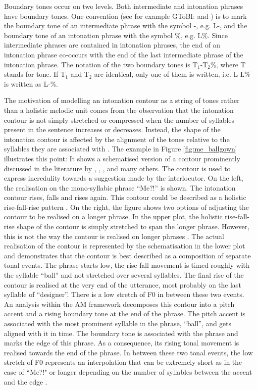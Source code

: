 Boundary tones occur on two levels. Both intermediate and intonation phrases have boundary tones. One convention (see for example GToBI: \citealp{GriceBaumann2002} and \citealp{GriceBaumannBenzmüller2005}) is to mark the boundary tone of an intermediate phrase with the symbol -, e.g. L-, and the boundary tone of an intonation phrase with the symbol \%, e.g. L\%. Since intermediate phrases are contained in intonation phrases, the end of an intonation phrase co-occurs with the end of the last intermediate phrase of the intonation phrase. The notation of the two boundary tones is T$_1$-T$_2$\%, where T stands for tone. If T$_1$ and T$_2$ are identical, only one of them is written, i.e. L-L\% is written as L-\%. 

The motivation of modelling an intonation contour as a string of tones rather than a holistic melodic unit comes from the observation that the intonation contour is not simply stretched or compressed when the number of syllables present in the sentence increases or decreases. Instead, the shape of the intonation contour is affected by the alignment of the tones relative to the syllables they are associated with \citep{Ladd2008, Arvaniti2011}. The example in Figure \ref{fig:me_ballgown} illustrates this point: It shows a schematised version of a contour prominently discussed in the literature by \citet{HirschbergWard1985}, \citet{HirschbergWard1992}, \citet{Arvaniti2011}, \citet{Ladd2008} and many others. The contour is used to express incredulity towards a suggestion made by the interlocutor. On the left, the realisation on the mono-syllabic phrase ``Me?!” is shown. The intonation contour rises, falls and rises again. This contour could be described as a holistic rise-fall-rise pattern \citep{Ladd2008}. On the right, the figure shows two options of adjusting the contour to be realised on a longer phrase. In the upper plot, the holistic rise-fall-rise shape of the contour is simply stretched to span the longer phrase. However, this is not the way the contour is realised on longer phrases \citep{Arvaniti2011}. The actual realisation of the contour is represented by the schematisation in the lower plot and demonstrates that the contour is best described as a composition of separate tonal events. The phrase starts low, the rise-fall movement is timed roughly with the syllable ``ball” and not stretched over several syllables. The final rise of the contour is realised at the very end of the utterance, most probably on the last syllable of ``designer”. There is a low stretch of F0 in between these two events. An analysis within the AM framework decomposes this contour into a pitch accent and a rising boundary tone at the end of the phrase. The pitch accent is associated with the most prominent syllable in the phrase, ``ball”, and gets aligned with it in time. The boundary tone is associated with the phrase and marks the edge of this phrase. As a consequence, its rising tonal movement is realised towards the end of the phrase. In between these two tonal events, the low stretch of F0 represents an interpolation that can be extremely short as in the case of ``Me?!" or longer depending on the number of syllables between the accent and the edge \citep{Ladd2008} . 


